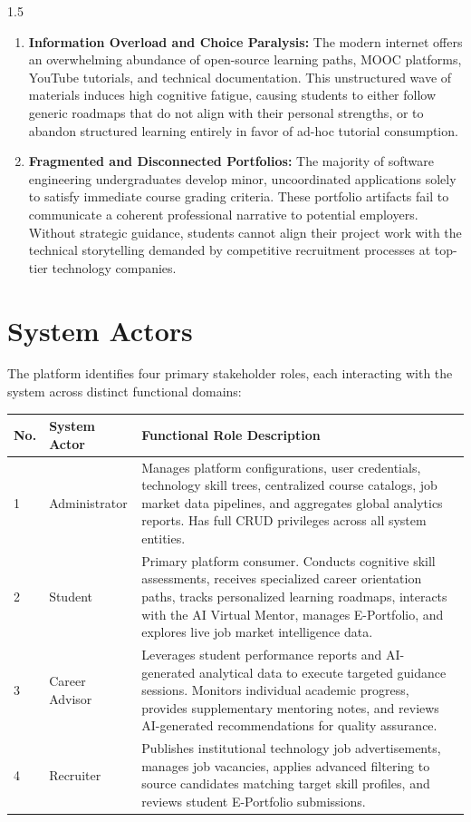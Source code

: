 \documentclass[12pt,a4paper]{report}
\begin{document}
\begin{spacing}{1.5}
\begin{enumerate}
			\item \textbf{Information Overload and Choice Paralysis:} The modern internet offers an overwhelming abundance of open-source learning paths, MOOC platforms, YouTube tutorials, and technical documentation. This unstructured wave of materials induces high cognitive fatigue, causing students to either follow generic roadmaps that do not align with their personal strengths, or to abandon structured learning entirely in favor of ad-hoc tutorial consumption.
			
			\item \textbf{Fragmented and Disconnected Portfolios:} The majority of software engineering undergraduates develop minor, uncoordinated applications solely to satisfy immediate course grading criteria. These portfolio artifacts fail to communicate a coherent professional narrative to potential employers. Without strategic guidance, students cannot align their project work with the technical storytelling demanded by competitive recruitment processes at top-tier technology companies.
		\end{enumerate}
		
		\section{System Actors}
		
		The platform identifies four primary stakeholder roles, each interacting with the system across distinct functional domains:
		
		\begin{longtable}{|p{1.5cm}|p{3.5cm}|p{9.5cm}|}
			\hline
			\rowcolor{gray!20}\textbf{No.} & \textbf{System Actor} & \textbf{Functional Role Description} \\ \hline
			1 & Administrator & Manages platform configurations, user credentials, technology skill trees, centralized course catalogs, job market data pipelines, and aggregates global analytics reports. Has full CRUD privileges across all system entities. \\ \hline
			2 & Student & Primary platform consumer. Conducts cognitive skill assessments, receives specialized career orientation paths, tracks personalized learning roadmaps, interacts with the AI Virtual Mentor, manages E-Portfolio, and explores live job market intelligence data. \\ \hline
			3 & Career Advisor & Leverages student performance reports and AI-generated analytical data to execute targeted guidance sessions. Monitors individual academic progress, provides supplementary mentoring notes, and reviews AI-generated recommendations for quality assurance. \\ \hline
			4 & Recruiter & Publishes institutional technology job advertisements, manages job vacancies, applies advanced filtering to source candidates matching target skill profiles, and reviews student E-Portfolio submissions. \\ \hline
		\end{longtable}
		

\end{spacing}
\end{document}
